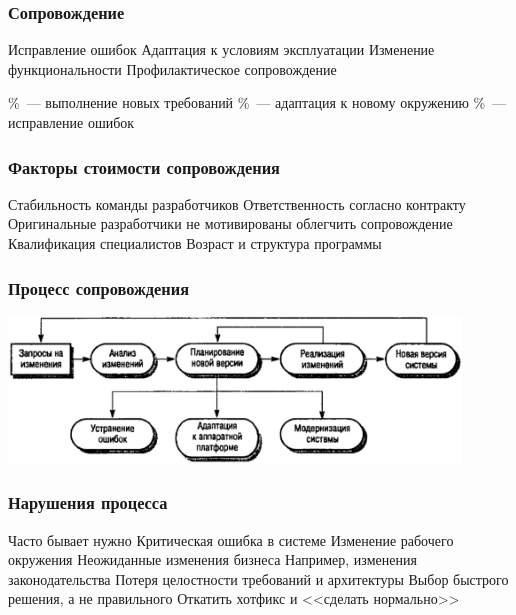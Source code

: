 \documentclass{../../slides-style}
\begin{document}
    \begin{frame}
        \frametitle{Сопровождение}
        \begin{outline}
            \1 Исправление ошибок
            \1 Адаптация к условиям эксплуатации
            \1 Изменение функциональности
            \1 Профилактическое сопровождение
        \end{outline}
        \pause
        \vspace{5mm}
        \begin{outline}
            \%~--- выполнение новых требований
            \%~--- адаптация к новому окружению
            \%~--- исправление ошибок
        \end{outline}
    \end{frame}

    \begin{frame}
        \frametitle{Факторы стоимости сопровождения}
        \begin{outline}
            \1 Стабильность команды разработчиков
            \1 Ответственность согласно контракту
                \2 Оригинальные разработчики не мотивированы облегчить сопровождение
            \1 Квалификация специалистов
            \1 Возраст и структура программы
        \end{outline}
    \end{frame}

    \begin{frame}
        \frametitle{Процесс сопровождения}
        \begin{center}
            \includegraphics[width=0.9\textwidth]{maintenanceProcess.png}
        \end{center}
    \end{frame}

    \begin{frame}
        \frametitle{Нарушения процесса}
        \begin{outline}
            \1 Часто бывает нужно
                \2 Критическая ошибка в системе
                \2 Изменение рабочего окружения
                \2 Неожиданные изменения бизнеса
                    \3 Например, изменения законодательства
            \1 Потеря целостности требований и архитектуры
            \1 Выбор быстрого решения, а не правильного
                \2 Откатить хотфикс и <<сделать нормально>>
        \end{outline}
    \end{frame}
\end{document}
